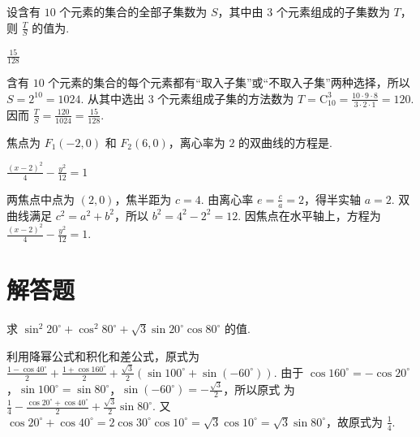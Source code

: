 \begin{problem}
设含有 \(10\) 个元素的集合的全部子集数为 \(S\)，其中由 \(3\) 个元素组成的子集数为 \(T\)，则 \(\frac{T}{S}\) 的值为\fillinblank{}.

\begin{answer}
\(\frac{15}{128}\)
\end{answer}

\begin{solution}
含有 \(10\) 个元素的集合的每个元素都有“取入子集”或“不取入子集”两种选择，所以 \(S=2^{10}=1024\). 从其中选出 \(3\) 个元素组成子集的方法数为 \(T=\mathrm C_{10}^{3}=\frac{10\cdot9\cdot8}{3\cdot2\cdot1}=120\). 因而 \(\frac{T}{S}=\frac{120}{1024}=\frac{15}{128}\).
\end{solution}
\end{problem}

\begin{problem}
焦点为 \(F_{1}(-2,0)\) 和 \(F_{2}(6,0)\)，离心率为 \(2\) 的双曲线的方程是\fillinblank{}.

\begin{answer}
\(\frac{\left(x-2\right)^2}{4}-\frac{y^2}{12}=1\)
\end{answer}

\begin{solution}
两焦点中点为 \((2,0)\)，焦半距为 \(c=4\). 由离心率 \(e=\frac{c}{a}=2\)，得半实轴 \(a=2\). 双曲线满足 \(c^2=a^2+b^2\)，所以 \(b^2=4^2-2^2=12\). 因焦点在水平轴上，方程为 \(\frac{(x-2)^2}{4}-\frac{y^2}{12}=1\).
\end{solution}
\end{problem}

\section{解答题}

\begin{problem}
求 \(\sin^2 20^\circ + \cos^2 80^\circ + \sqrt{3} \sin 20^\circ \cos 80^\circ\) 的值.

\begin{solution}
利用降幂公式和积化和差公式，原式为 \(\frac{1-\cos40^\circ}{2}+\frac{1+\cos160^\circ}{2}+\frac{\sqrt3}{2}\left(\sin100^\circ+\sin(-60^\circ)\right)\).
由于 \(\cos160^\circ=-\cos20^\circ\)，\(\sin100^\circ=\sin80^\circ\)，\(\sin(-60^\circ)=-\frac{\sqrt3}{2}\)，所以原式
为 \(\frac{1}{4}-\frac{\cos20^\circ+\cos40^\circ}{2}+\frac{\sqrt3}{2}\sin80^\circ\).
又 \(\cos20^\circ+\cos40^\circ=2\cos30^\circ\cos10^\circ=\sqrt3\cos10^\circ=\sqrt3\sin80^\circ\)，故原式为 \(\frac{1}{4}\).
\end{solution}
\end{problem}

